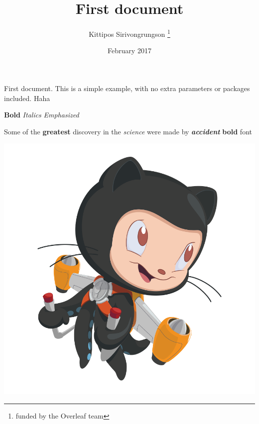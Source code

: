 \documentclass[12pt, letterpaper]{article}
\title{First document}
\author{Kittipos Sirivongrungson \thanks{funded by the Overleaf team}}
\date{February 2017}
\begin{document}
\maketitle

First document. This is a simple example, with no 
extra parameters or packages included. Haha


\textbf{Bold} \textit{Italics} \emph{Emphasized}

Some of the \textbf{greatest} discovery in the \textit{science} were made by \textbf{\textit{accident}}
\textbf{bold} font 

\includegraphics[scale = 0.2]{octocat.png} %
\end{document}
